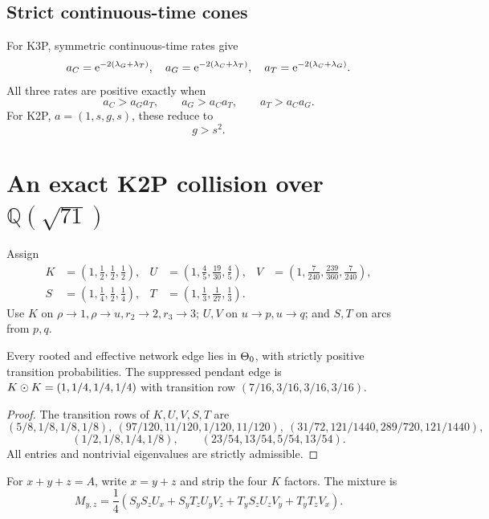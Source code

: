 \documentclass[11pt]{article}
\theoremstyle{remark}\newtheorem{remark}[theorem]{Remark}
\begin{document}
\subsection{Strict continuous-time cones}
For K3P, symmetric continuous-time rates give
\[
a_C=\mathrm e^{-2(\lambda_G+\lambda_T)},\quad a_G=\mathrm e^{-2(\lambda_C+\lambda_T)},\quad a_T=\mathrm e^{-2(\lambda_C+\lambda_G)}.
\]
All three rates are positive exactly when
\begin{equation}\label{eq:k3p-ct}a_C>a_Ga_T,\qquad a_G>a_Ca_T,\qquad a_T>a_Ca_G.\end{equation}
For K2P, $a=(1,s,g,s)$, these reduce to
\begin{equation}\label{eq:k2p-ct}g>s^2.\end{equation}

\section{An exact K2P collision over \texorpdfstring{$\mathbb Q(\sqrt{71})$}{Q(sqrt(71))}}\label{sec:k2p-simple}
Assign
\begin{equation}\label{eq:k2p-vectors}
\begin{aligned}
K&=(1,\tfrac12,\tfrac12,\tfrac12),&U&=(1,\tfrac45,\tfrac{19}{30},\tfrac45),&V&=(1,\tfrac7{240},\tfrac{239}{360},\tfrac7{240}),\\
S&=(1,\tfrac14,\tfrac12,\tfrac14),&T&=(1,\tfrac13,\tfrac1{27},\tfrac13).
\end{aligned}
\end{equation}
Use $K$ on $\rho\to1,\rho\to u,r_2\to2,r_3\to3$; $U,V$ on $u\to p,u\to q$; and $S,T$ on arcs from $p,q$.
\begin{lemma}\label{lem:k2p-adm}
Every rooted and effective network edge lies in $\Theta_0$, with strictly positive transition probabilities. The suppressed pendant edge is $K\mathbin{\odot} K=(1,1/4,1/4,1/4)$ with transition row $(7/16,3/16,3/16,3/16)$.
\end{lemma}
\begin{proof}
The transition rows of $K,U,V,S,T$ are
\[
(5/8,1/8,1/8,1/8),\ (97/120,11/120,1/120,11/120),\ (31/72,121/1440,289/720,121/1440),
\]
\[
(1/2,1/8,1/4,1/8),\qquad(23/54,13/54,5/54,13/54).
\]
All entries and nontrivial eigenvalues are strictly admissible.
\end{proof}
For $x+y+z=A$, write $x=y+z$ and strip the four $K$ factors. The mixture is
\begin{equation}\label{eq:k2p-M}M_{y,z}=\frac14(S_yS_zU_x+S_yT_zU_yV_z+T_yS_zU_zV_y+T_yT_zV_x).\end{equation}
\end{document}
